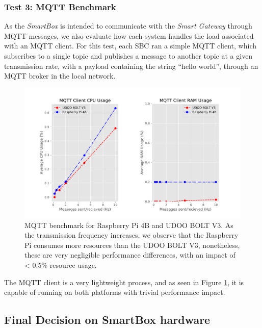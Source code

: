 \subsubsection{Test 3: \acs{MQTT} Benchmark}

As the \textit{SmartBox} is intended to communicate with the \textit{Smart Gateway} through \acs{MQTT} messages, we also evaluate how each system handles the load associated with an \acs{MQTT} client. For this test, each \acs{SBC} ran a simple \acs{MQTT} client, which subscribes to a single topic and publishes a message to another topic at a given transmission rate, with a payload containing the string ``hello world'', through an \acs{MQTT} broker in the local network.

\begin{figure}[H]
    \centering
    \includegraphics[width=\linewidth]{images/mqtt_test_results.pdf}
    \caption[\acs{MQTT} benchmark for Raspberry Pi 4B and UDOO BOLT V3.]{\acs{MQTT} benchmark for Raspberry Pi 4B and UDOO BOLT V3. As the transmission frequency increases, we observe that the Raspberry Pi consumes more resources than the UDOO BOLT V3, nonetheless, these are very negligible performance differences, with an impact of < 0.5\% resource usage.}
    \label{fig:mqtt-tests}
\end{figure}

The \acs{MQTT} client is a very lightweight process, and as seen in Figure \ref{fig:mqtt-tests}, it is capable of running on both platforms with trivial performance impact.

\subsection{Final Decision on SmartBox hardware}

